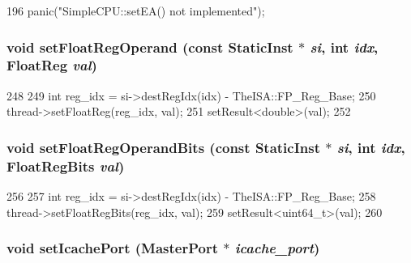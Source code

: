 \begin{DoxyCode}
196 { panic("SimpleCPU::setEA() not implemented\n"); }
\end{DoxyCode}
\hypertarget{classCheckerCPU_addc8b4b6511725bf8ff48bd09ef22892}{
\subsubsection[{setFloatRegOperand}]{\setlength{\rightskip}{0pt plus 5cm}void setFloatRegOperand (const {\bf StaticInst} $\ast$ {\em si}, \/  int {\em idx}, \/  {\bf FloatReg} {\em val})}}
\label{classCheckerCPU_addc8b4b6511725bf8ff48bd09ef22892}



\begin{DoxyCode}
248     {
249         int reg_idx = si->destRegIdx(idx) - TheISA::FP_Reg_Base;
250         thread->setFloatReg(reg_idx, val);
251         setResult<double>(val);
252     }
\end{DoxyCode}
\hypertarget{classCheckerCPU_a80a516966713c873cf964af7538dbd37}{
\subsubsection[{setFloatRegOperandBits}]{\setlength{\rightskip}{0pt plus 5cm}void setFloatRegOperandBits (const {\bf StaticInst} $\ast$ {\em si}, \/  int {\em idx}, \/  {\bf FloatRegBits} {\em val})}}
\label{classCheckerCPU_a80a516966713c873cf964af7538dbd37}



\begin{DoxyCode}
256     {
257         int reg_idx = si->destRegIdx(idx) - TheISA::FP_Reg_Base;
258         thread->setFloatRegBits(reg_idx, val);
259         setResult<uint64_t>(val);
260     }
\end{DoxyCode}
\hypertarget{classCheckerCPU_a925d02a64d6c947d4ba3bb96bef728ff}{
\subsubsection[{setIcachePort}]{\setlength{\rightskip}{0pt plus 5cm}void setIcachePort ({\bf MasterPort} $\ast$ {\em icache\_\-port})}}
\label{classCheckerCPU_a925d02a64d6c947d4ba3bb96bef728ff}



